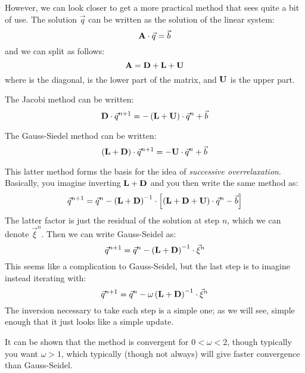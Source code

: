 However, we can look closer to get a more practical method that sees
quite a bit of use. The solution $\vec{q}$ can be written as the
solution of the linear system:
\begin{equation}
{\bf A}\cdot\vec{q} = \vec{b}
\end{equation}
and we can split  as follows:
\begin{equation}
{\bf A} = {\bf D} + {\bf L} + {\bf U}
\end{equation}
where  is the diagonal,  is the lower part of the
matrix, and ${\bf U}$ is the upper part.

The Jacobi method can be written:
\begin{equation}
{\bf D}\cdot\vec{q}^{n+1} = - \left({\bf L}
+ {\bf U}\right) \cdot \vec{q}^n + \vec{b}
\end{equation}

The Gauss-Siedel method can be written:
\begin{equation}
\left({\bf L} + {\bf D}\right)\cdot\vec{q}^{n+1}
= - {\bf U}\cdot \vec{q}^n + \vec{b}
\end{equation}

This latter method forms the basis for the idea of {\it successive
overrelaxation}. Basically, you imagine inverting ${\bf L}+{\bf D}$
and you then write the same method as:
\begin{equation}
\vec{q}^{n+1} = \vec{q}^n
- \left({\bf L}+{\bf D}\right)^{-1}\cdot \left[
\left({\bf L}+{\bf D}+{\bf U}\right)\cdot\vec{q}^n - \vec{b}\right]
\end{equation}
The latter factor is just the residual of the solution at step $n$,
which we can denote $\vec{\xi}^n$. Then we can write Gauss-Seidel as:
\begin{equation}
\vec{q}^{n+1} = \vec{q}^n
- \left({\bf L}+{\bf D}\right)^{-1}\cdot \vec{\xi}^n
\end{equation}
This seems like a complication to Gauss-Seidel, but the last step is
to imagine instead iterating with:
\begin{equation}
\vec{q}^{n+1} = \vec{q}^n - \omega
\left({\bf L}+{\bf D}\right)^{-1}\cdot \vec{\xi}^n
\end{equation}
The inversion necessary to take each step is a simple one; as we will
see, simple enough that it just looks like a simple update.

It can be shown that the method is convergent for $0<\omega<2$, though
typically you want $\omega>1$, which typically (though not always) 
will give faster convergence than Gauss-Seidel.

